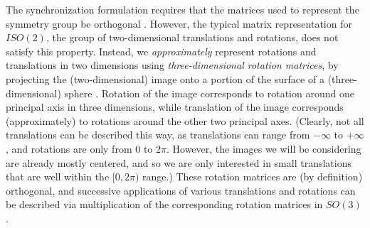 \documentclass{pnastwo}
\begin{document}
\begin{article}
The synchronization formulation requires that the matrices used to represent the symmetry group be orthogonal \cite{singer2013spectral}.  
%
However, the typical matrix representation for $ISO(2)$, the group of two-dimensional translations and rotations, does not satisfy this property.
%
Instead, we {\it approximately} represent rotations and translations in two dimensions using {\it three-dimensional rotation matrices}, by projecting the (two-dimensional) image onto a portion of the surface of a (three-dimensional) sphere \cite{singer2011angular}.
%
Rotation of the image corresponds to rotation around one principal axis in three dimensions, while translation of the image corresponds (approximately) to rotations around the other two principal axes. (Clearly, not all translations can be described this way, as translations can range from $-\infty$ to $+ \infty$, and rotations are only from $0$ to $2 \pi$. However, the images we will be considering are already mostly centered, and so we are only interested in small translations that are well within the $[0, 2\pi)$ range.)
%
These rotation matrices are (by definition) orthogonal, and successive applications of various translations and rotations can be described via multiplication of the corresponding rotation matrices in $SO(3)$.




\end{article}
\end{document}
